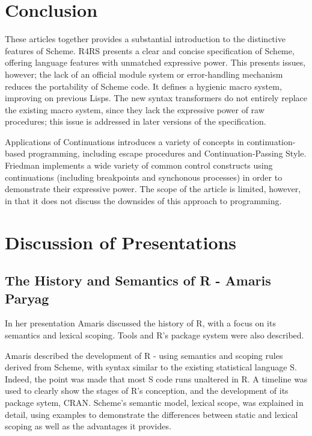 \documentclass[11pt]{article}
\begin{document}
\section{Conclusion}
\label{sec:org772d3fe}
These articles together provides a substantial introduction to the distinctive features of Scheme. R4RS presents a clear and concise specification of Scheme, offering language features with unmatched expressive power. This presents issues, however; the lack of an official module system or error-handling mechanism reduces the portability of Scheme code. It defines a hygienic macro system, improving on previous Lisps. The new syntax transformers do not entirely replace the existing macro system, since they lack the expressive power of raw procedures; this issue is addressed in later versions of the specification. 

Applications of Continuations introduces a variety of concepts in continuation-based programming, including escape procedures and Continuation-Passing Style. Friedman implements a wide variety of common control constructs using continuations (including breakpoints and synchonous processes) in order to demonstrate their expressive power. The scope of the article is limited, however, in that it does not discuss the downsides of this approach to programming.



 

\clearpage
\section{Discussion of Presentations}
\label{sec:orgf703059}
\subsection{The History and Semantics of R - Amaris Paryag}
\label{sec:org6ca3b9d}
In her presentation Amaris discussed the history of R, with a focus on its semantics and lexical scoping. Tools and R's package system were also described.

Amaris described the development of R - using semantics and scoping rules derived from Scheme, with syntax similar to the existing statistical language S. Indeed, the point was made that most S code runs unaltered in R. A timeline was used to clearly show the stages of R's conception, and the development of its package sytem, CRAN. Scheme's semantic model, lexical scope, was explained in detail, using examples to demonstrate the differences between static and lexical scoping as well as the advantages it provides.
\end{document}

